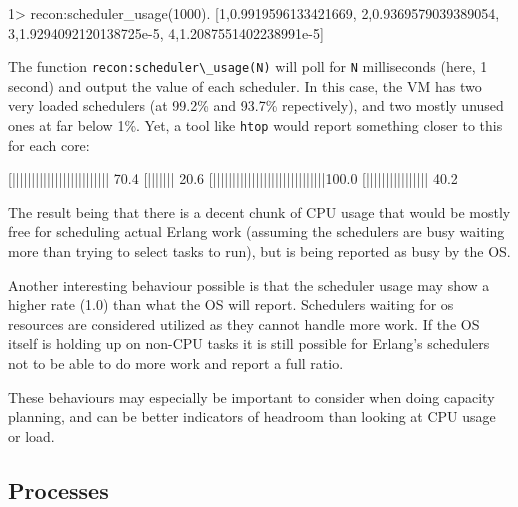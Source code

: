 \documentclass[11pt, oneside]{book}   	%
\newcommand{\app}[1]{\Verb`#1`}
\newcommand{\function}[1]{\Verb`#1`}
\newcommand{\var}[1]{\Verb`#1`}
\begin{document}
\begin{VerbatimEshell}
1> recon:scheduler_usage(1000).
[{1,0.9919596133421669},
 {2,0.9369579039389054},
 {3,1.9294092120138725e-5},
 {4,1.2087551402238991e-5}]
\end{VerbatimEshell}

The function \function{recon:scheduler\_usage(N)} will poll for \var{N} milliseconds (here, 1 second) and output the value of each scheduler. In this case, the VM has two very loaded schedulers (at 99.2\% and 93.7\% repectively), and two mostly unused ones at far below 1\%. Yet, a tool like \app{htop} would report something closer to this for each core:

\begin{VerbatimText}
[|||||||||||||||||||||||||     70.4%
[|||||||                       20.6%
[|||||||||||||||||||||||||||||100.0%
[||||||||||||||||              40.2%
\end{VerbatimText}

The result being that there is a decent chunk of CPU usage that would be mostly free for scheduling actual Erlang work (assuming the schedulers are busy waiting more than trying to select tasks to run), but is being reported as busy by the OS.

Another interesting behaviour possible is that the scheduler usage may show a higher rate (1.0) than what the OS will report. Schedulers waiting for os resources are considered utilized as they cannot handle more work. If the OS itself is holding up on non-CPU tasks it is still possible for Erlang's schedulers not to be able to do more work and report a full ratio.

These behaviours may especially be important to consider when doing capacity planning, and can be better indicators of headroom than looking at CPU usage or load.


\subsection{Processes}
\label{subsec:global-procs}
\end{document}
